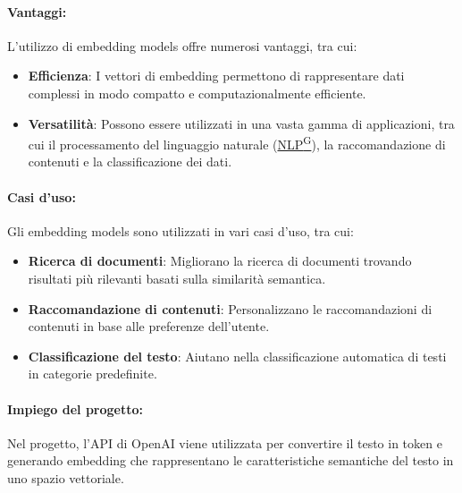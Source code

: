 \paragraph{Vantaggi:}
L'utilizzo di embedding models offre numerosi vantaggi, tra cui:
\begin{itemize}
    \item \textbf{Efficienza}: I vettori di embedding permettono di rappresentare dati complessi in modo compatto e computazionalmente efficiente.
    \item \textbf{Versatilità}: Possono essere utilizzati in una vasta gamma di applicazioni, tra cui il processamento del linguaggio naturale (\href{https://code7crusaders.github.io/docs/PB/documentazione_interna/glossario.html#natural-language-processing-nlp}{NLP\textsuperscript{G}}), la raccomandazione di contenuti e la classificazione dei dati.
\end{itemize}
\paragraph{Casi d'uso:}
Gli embedding models sono utilizzati in vari casi d'uso, tra cui:
\begin{itemize}
    \item \textbf{Ricerca di documenti}: Migliorano la ricerca di documenti trovando risultati più rilevanti basati sulla similarità semantica.
    \item \textbf{Raccomandazione di contenuti}: Personalizzano le raccomandazioni di contenuti in base alle preferenze dell'utente.
    \item \textbf{Classificazione del testo}: Aiutano nella classificazione automatica di testi in categorie predefinite.
\end{itemize}



\paragraph{Impiego del progetto:}
Nel progetto, l'API di OpenAI viene utilizzata per convertire il testo in token e generando embedding che rappresentano le caratteristiche semantiche del testo in uno spazio vettoriale.



